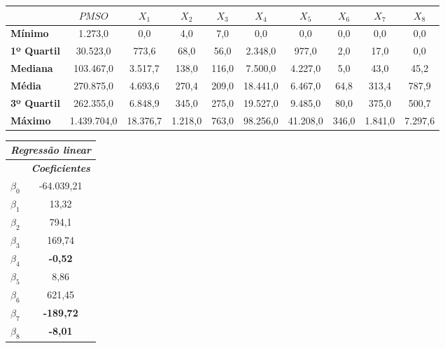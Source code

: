 \documentclass{article}
\begin{document}
\begin{table}[]
	\centering
	\begin{tabular}{l|ccccccccc}
		& \textbf{$PMSO$} & \textbf{{$X_1$}} & \textbf{$X_2$} & \textbf{$X_3$} & \textbf{$X_4$} & \textbf{$X_5$} & \textbf{$X_6$} & \textbf{$X_7$} & \textbf{$X_8$} \\ \hline \hline
		\textbf{Mínimo}     & 1.273,0       & 0,0         & 4,0         & 7,0         & 0,0         & 0,0         & 0,0         & 0,0         & 0,0         \\
		\textbf{1º Quartil} & 30.523,0      & 773,6       & 68,0        & 56,0        & 2.348,0     & 977,0       & 2,0         & 17,0        & 0,0         \\
		\textbf{Mediana}    & 103.467,0     & 3.517,7     & 138,0       & 116,0       & 7.500,0     & 4.227,0     & 5,0         & 43,0        & 45,2        \\
		\textbf{Média}      & 270.875,0     & 4.693,6     & 270,4       & 209,0       & 18.441,0    & 6.467,0     & 64,8        & 313,4       & 787,9       \\
		\textbf{3º Quartil} & 262.355,0     & 6.848,9     & 345,0       & 275,0       & 19.527,0    & 9.485,0     & 80,0        & 375,0       & 500,7       \\
		\textbf{Máximo}     & 1.439.704,0   & 18.376,7    & 1.218,0     & 763,0       & 98.256,0    & 41.208,0    & 346,0       & 1.841,0     & 7.297,6     \\ \hline \hline
	\end{tabular}
\end{table}



\begin{table}[]
	\centering
	\begin{tabular}{l|c}
		\hline
		\multicolumn{2}{l}{\textit{\textbf{Regressão linear}}} \\ \hline
		\multicolumn{1}{l|}{} & \textit{\textbf{Coeficientes}} \\ \hline
		\multicolumn{1}{l|}{$\beta_0$} & -64.039,21 \\
		\multicolumn{1}{l|}{$\beta_1$} & 13,32 \\
		\multicolumn{1}{l|}{$\beta_2$} & 794,1 \\
		\multicolumn{1}{l|}{$\beta_3$} & 169,74 \\
		\multicolumn{1}{l|}{$\beta_4$} & {\color[HTML]{FE0000} \textbf{-0,52}}   \\
		\multicolumn{1}{l|}{$\beta_5$} & 8,86 \\
		\multicolumn{1}{l|}{$\beta_6$} & 621,45 \\
		\multicolumn{1}{l|}{$\beta_7$} & {\color[HTML]{FE0000} \textbf{-189,72}} \\
		\multicolumn{1}{l|}{$\beta_8$} & {\color[HTML]{FE0000} \textbf{-8,01}}   \\ 
		\hline \hline
	\end{tabular}
\end{table}
\end{document}
